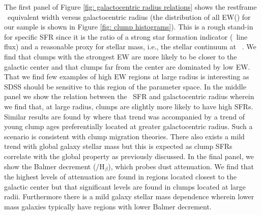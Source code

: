  The first panel of Figure \ref{fig: galactocentric radius relations} shows the restframe \ha~equivalent width versus galactocentric radius (the distribution of all EW(\ha) for our sample is shown in Figure \ref{fig: clump histograms}). This is a rough stand-in for specific SFR since it is the ratio of a strong star formation indicator (\ha~line flux) and a reasonable proxy for stellar mass, i.e., the stellar continuum at \ha~\citep{MarmolQueralto2016}. We find that clumps with the strongest EW are more likely to be closer to the galactic center and that clumps far from the center are dominated by low EW. That we find few examples of high EW regions at large radius is interesting as SDSS should be sensitive to this region of the parameter space. In the middle panel we show the relation between the \ha~SFR and galactocentric radius wherein we find that, at large radius, clumps are slightly more likely to have high SFRs. Similar results are found by  \cite{Soto2017} where that trend was accompanied by a trend of young clump ages preferentially located at greater galactocentric radius. Such a scenario is consistent with clump migration theories. There also exists a mild trend with global galaxy stellar mass but this is expected as clump SFRs correlate with the global property as previously discussed. In the final panel, we show the Balmer decrement (\ha/H$_{\beta}$), which probes dust attenuation.  We find that the highest levels of attenuation are found in regions located closest to the galactic center but that significant levels are found in clumps located at large radii.  Furthermore there is a mild galaxy stellar mass dependence wherein lower mass galaxies typically have regions with lower Balmer decrement. 



